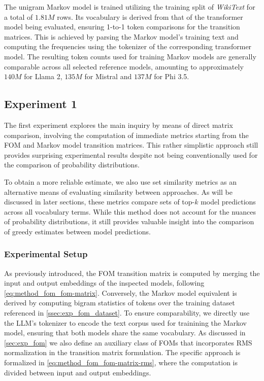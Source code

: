 The unigram Markov model is trained utilizing the training split of \emph{WikiText} for a total of $1.81M$ rows.
Its vocabulary is derived from that of the transformer model being evaluated, ensuring 1-to-1 token comparisons for the transition matrices.
This is achieved by parsing the Markov model's training text and computing the frequencies using the tokenizer of the corresponding transformer model.
The resulting token counts used for training Markov models are generally comparable across all selected reference models, amounting to approximately $140M$ for Llama 2, $135M$ for Mistral and $137M$ for Phi 3.5.

\subsection{Experiment 1}\label{ssec:exp_fom_exp1}

The first experiment explores the main inquiry by means of direct matrix comparison, involving the computation of immediate metrics starting from the FOM and Markov model transition matrices.
This rather simplistic approach still provides surprising experimental results despite not being conventionally used for the comparison of probability distributions.

To obtain a more reliable estimate, we also use set similarity metrics as an alternative means of evaluating similarity between approaches.
As will be discussed in later sections, these metrics compare sets of top-$k$ model predictions across all vocabulary terms.
While this method does not account for the nuances of probability distributions, it still provides valuable insight into the comparison of greedy estimates between model predictions.

\subsubsection{Experimental Setup}\label{sssec:exp_fom_exp1_expset}

As previously introduced, the FOM transition matrix is computed by merging the input and output embeddings of the inspected models, following \cref{eq:method_fom_fom-matrix}.
Conversely, the Markov model equivalent is derived by computing bigram statistics of tokens over the training dataset referenced in \cref{ssec:exp_fom_dataset}.
To ensure comparability, we directly use the LLM's tokenizer to encode the text corpus used for trainining the Markov model, ensuring that both models share the same vocabulary.
As discussed in \cref{sec:exp_fom} we also define an auxiliary class of FOMs that incorporates RMS normalization in the transition matrix formulation.
The specific approach is formalized in \cref{eq:method_fom_fom-matrix-rms}, where the computation is divided between input and output embeddings.

